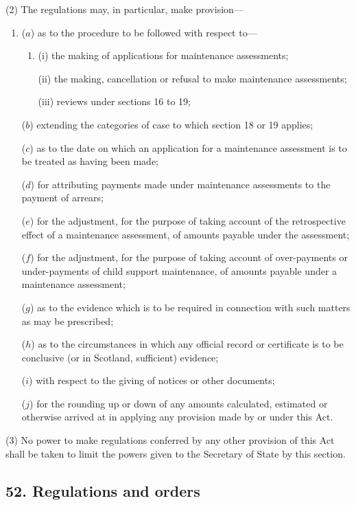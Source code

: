 \documentclass[12pt,a4paper]{article}
\begin{document}
(2) The regulations may, in particular, make provision—
\begin{enumerate}\item[]
($a$) as to the procedure to be followed with respect to—
\begin{enumerate}\item[]
(i) the making of applications for maintenance assessments;

(ii) the making, cancellation or refusal to make maintenance assessments;

(iii) reviews under sections 16 to 19;
\end{enumerate}

($b$) extending the categories of case to which section 18 or 19 applies;

($c$) as to the date on which an application for a maintenance assessment is to be treated as having been made;

($d$) for attributing payments made under maintenance assessments to the payment of arrears;

($e$) for the adjustment, for the purpose of taking account of the retrospective effect of a maintenance assessment, of amounts payable under the assessment;

($f$) for the adjustment, for the purpose of taking account of over-payments or under-payments of child support maintenance, of amounts payable under a maintenance assessment;

($g$) as to the evidence which is to be required in connection with such matters as may be prescribed;

($h$) as to the circumstances in which any official record or certificate is to be conclusive (or in Scotland, sufficient) evidence;

($i$) with respect to the giving of notices or other documents;

($j$) for the rounding up or down of any amounts calculated, estimated or otherwise arrived at in applying any provision made by or under this Act.
\end{enumerate}

(3) No power to make regulations conferred by any other provision of this Act shall be taken to limit the powers given to the Secretary of State by this section.


\subsection{52. Regulations and orders}
\end{document}
